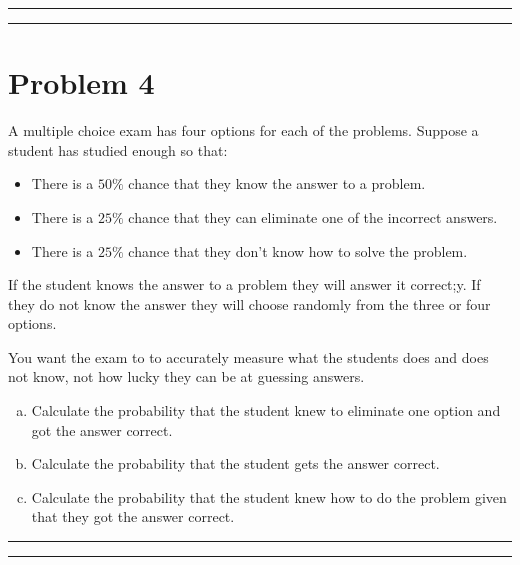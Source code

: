 \documentclass{article}
\theoremstyle{definition}
\newenvironment{solution}{\bigskip\hrule{\hfill}}{\bigskip\hrule{\hfill}} %
\begin{document}
\begin{solution}


\end{solution}


\newpage


\section*{Problem 4}

A multiple choice exam has four options for each of the problems. Suppose a student has studied enough so that:
\begin{itemize}
    \item There is a $50\%$ chance that they know the answer to a problem.
    \item There is a $25\%$ chance that they can eliminate one of the incorrect answers.
    \item There is a $25\%$ chance that they don't know how to solve the problem.
\end{itemize}
If the student knows the answer to a problem they will answer it correct;y. If they do not know the answer they will choose randomly from the three or four options. 

You want the exam to to accurately measure what the students does and does not know, not how lucky they can be at guessing answers.

\begin{enumerate}[a)] %
    \item Calculate the probability that the student knew to eliminate one option and got the answer correct.
    \item Calculate the probability that the student gets the answer correct.
    \item Calculate the probability that the student knew how to do the problem given that they got the answer correct.
\end{enumerate}
\begin{solution}


\end{solution}
\end{document}
